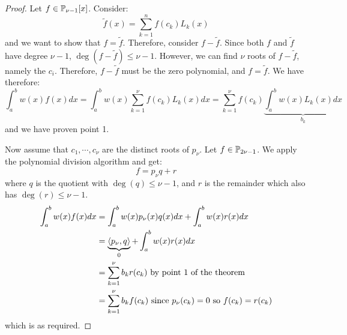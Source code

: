 \documentclass[../Main.tex]{subfiles}
\begin{document}
\begin{proof}
    Let $f \in \P_{\nu - 1}[x]$. Consider:
    \begin{equation*}
        \tilde{f}(x) = \sum_{k=1}^{n} f(c_k) L_k(x)
    \end{equation*}
    and we want to show that $f = \tilde{f}$. Therefore, consider $f - \tilde{f}$. Since both $f$ and $\tilde{f}$ have degree $\nu - 1$, $\deg(f - \tilde{f}) \leq \nu - 1$. However, we can find $\nu$ roots of $f - \tilde{f}$, namely the $c_i$. Therefore, $f - \tilde{f}$ must be the zero polynomial, and $f = \tilde{f}$. We have therefore:
    \begin{equation*}
        \int_{a}^{b} w(x) f(x) dx = \int_{a}^{b} w(x) \sum_{k=1}^{\nu} f(c_k) L_k(x) dx  = \sum_{k=1}^{\nu} f(c_k) \underbrace{\int_{a}^{b} w(x) L_k(x) dx}_{b_k}
    \end{equation*}
    and we have proven point 1.

    Now assume that $c_1, \cdots, c_\nu$ are the distinct roots of $p_{\nu}$. Let $f \in \P_{2\nu - 1}$. We apply the polynomial division algorithm and get:
    \begin{equation*}
        f = p_\nu q + r
    \end{equation*}
    where $q$ is the quotient with $\deg(q) \leq \nu - 1$, and $r$ is the remainder which also has $\deg(r) \leq \nu - 1$.
    \begin{align*}
        \int_{a}^{b} w(x) f(x) dx &= \int_{a}^{b} w(x) p_\nu(x) q(x) dx + \int_{a}^{b} w(x) r(x) dx \\
        &= \underbrace{\inn{p_\nu}{q}}_{0} + \int_{a}^{b} w(x) r(x) dx \\
        &= \sum_{k=1}^{\nu} b_k r(c_k) \text{ by point 1 of the theorem} \\
        &= \sum_{k=1}^{\nu} b_k f(c_k) \text{ since $p_\nu(c_k) = 0$ so $f(c_k) = r(c_k)$}
    \end{align*}
    which is as required.
\end{proof}
\end{document}
